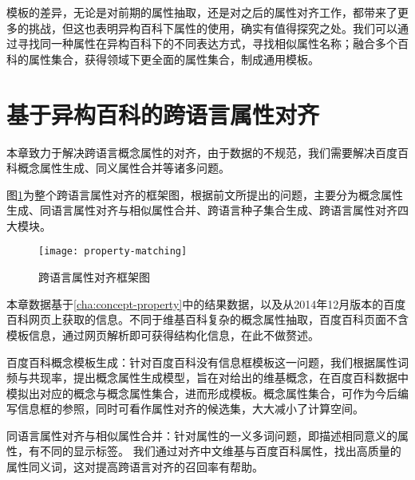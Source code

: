 模板的差异，无论是对前期的属性抽取，还是对之后的属性对齐工作，都带来了更多的挑战，但这也表明异构百科下属性的使用，确实有值得探究之处。我们可以通过寻找同一种属性在异构百科下的不同表达方式，寻找相似属性名称；融合多个百科的属性集合，获得领域下更全面的属性集合，制成通用模板。

\section{基于异构百科的跨语言属性对齐}
\label{sec:property-matching}

本章致力于解决跨语言概念属性的对齐，由于数据的不规范，我们需要解决百度百科概念属性生成、同义属性合并等诸多问题。


图\ref{fig:property-matching}为整个跨语言属性对齐的框架图，根据前文所提出的问题，主要分为概念属性生成、同语言属性对齐与相似属性合并、跨语言种子集合生成、跨语言属性对齐四大模块。

\begin{figure}[H]
  \centering
  \texttt{[image: property-matching]}
  \caption{跨语言属性对齐框架图}
  \label{fig:property-matching}
\end{figure}

本章数据基于\ref{cha:concept-property}中的结果数据，以及从2014年12月版本的百度百科网页上获取的信息。不同于维基百科复杂的概念属性抽取，百度百科页面不含模板信息，通过网页解析即可获得结构化信息，在此不做赘述。

{\heiti 百度百科概念模板生成：}针对百度百科没有信息框模板这一问题，我们根据属性词频与共现率，提出概念属性生成模型，旨在对给出的维基概念，在百度百科数据中模拟出对应的概念与概念属性集合，进而形成模板。概念属性集合，可作为今后编写信息框的参照，同时可看作属性对齐的候选集，大大减小了计算空间。

{\heiti 同语言属性对齐与相似属性合并：}针对属性的一义多词问题，即描述相同意义的属性，有不同的显示标签。
我们通过对齐中文维基与百度百科属性，找出高质量的属性同义词，这对提高跨语言对齐的召回率有帮助。

